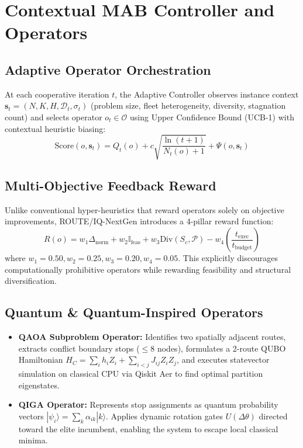 \documentclass[journal,10pt]{IEEEtran}
\begin{document}
\section{Contextual MAB Controller and Operators}

\subsection{Adaptive Operator Orchestration}
At each cooperative iteration $t$, the Adaptive Controller observes instance context $\mathbf{s}_t = (N, K, H, \mathcal{D}_t, \sigma_t)$ (problem size, fleet heterogeneity, diversity, stagnation count) and selects operator $o_t \in \mathcal{O}$ using Upper Confidence Bound (UCB-1) with contextual heuristic biasing:
\begin{equation}
\text{Score}(o, \mathbf{s}_t) = Q_t(o) + c \sqrt{\frac{\ln(t + 1)}{N_t(o) + 1}} + \Psi(o, \mathbf{s}_t)
\end{equation}

\subsection{Multi-Objective Feedback Reward}
Unlike conventional hyper-heuristics that reward operators solely on objective improvements, ROUTE/IQ-NextGen introduces a 4-pillar reward function:
\begin{equation}
R(o) = w_1 \Delta_{\text{norm}} + w_2 \mathbb{I}_{\text{feas}} + w_3 \text{Div}(S_c, \mathcal{P}) - w_4 \left(\frac{t_{\text{exec}}}{t_{\text{budget}}}\right)
\end{equation}
where $w_1 = 0.50, w_2 = 0.25, w_3 = 0.20, w_4 = 0.05$. This explicitly discourages computationally prohibitive operators while rewarding feasibility and structural diversification.

\subsection{Quantum & Quantum-Inspired Operators}
\begin{itemize}
    \item \textbf{QAOA Subproblem Operator:} Identifies two spatially adjacent routes, extracts conflict boundary stops ($\le 8$ nodes), formulates a 2-route QUBO Hamiltonian $H_C = \sum_i h_i Z_i + \sum_{i<j} J_{ij} Z_i Z_j$, and executes statevector simulation on classical CPU via Qiskit Aer to find optimal partition eigenstates.
    \item \textbf{QIGA Operator:} Represents stop assignments as quantum probability vectors $|\psi_i\rangle = \sum_k \alpha_{ik} |k\rangle$. Applies dynamic rotation gates $U(\Delta \theta)$ directed toward the elite incumbent, enabling the system to escape local classical minima.
\end{itemize}
\end{document}

